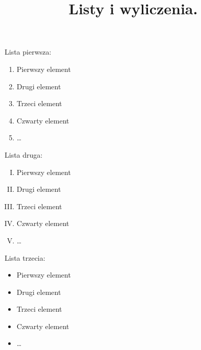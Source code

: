 ﻿\documentclass[11pt,a4paper]{article}       %
\title{Listy i wyliczenia.}
\author{}                                   %
\date{}                                     %
\begin{document}
\maketitle


Lista pierwsza:
 \begin{enumerate}
\item Pierwszy element
\item Drugi  element
\item Trzeci element
\item Czwarty element
\item \ldots
\end{enumerate}

\vspace{10mm}		%
Lista druga: 
 \begin{enumerate}[I.]
\item Pierwszy element
\item Drugi  element
\item Trzeci element
\item Czwarty element
\item \ldots
\end{enumerate}

\vspace{10mm}		%
Lista trzecia:
\begin{itemize}
\item Pierwszy element
\item Drugi  element
\item Trzeci element
\item Czwarty element
\item \ldots
\end{itemize}
\end{document}

